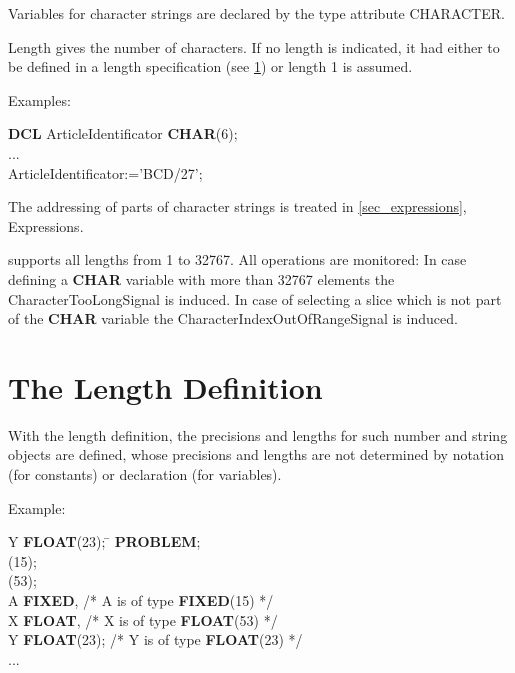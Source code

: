 Variables for character strings are declared by the type attribute
CHARACTER.



Length gives the number of characters. If no length is indicated, it had
either to be defined in a length specification (see \ref{sec_length}) or length 1 is
assumed.

Examples:

{\bf DCL} ArticleIdentificator {\bf CHAR}(6);\\
...\\
ArticleIdentificator:='BCD/27';

The addressing of parts of character strings is treated in
 \ref{sec_expressions}, Expressions.

\OpenPEARL{} supports all lengths from 1 to 32767.
All operations are monitored:
In case defining a {\bf CHAR} variable with more than 32767 elements the
CharacterTooLongSignal is induced.
In case of selecting a slice which is not part of the {\bf CHAR} variable the 
CharacterIndexOutOfRangeSignal is induced.

\section{The Length Definition}   %
\label{sec_length}

With the length definition, the precisions and lengths for such
number and string objects are defined, whose precisions and lengths are
not determined by notation (for constants) or declaration (for
variables).


Example:

\begin{tabbing}
\x \x Y {\bf FLOAT}(23); \x \= \kill
{\bf PROBLEM}; \> \\
(15); \> \\
(53); \> \\
 A {\bf FIXED}, \> /* A is of type {\bf FIXED}(15) */ \\
\x \x X {\bf FLOAT},        \> /* X is of type {\bf FLOAT}(53) */ \\
\x \x Y {\bf FLOAT}(23);    \> /* Y is of type {\bf FLOAT}(23) */ \\
\x ... \> \\
\end{tabbing}

